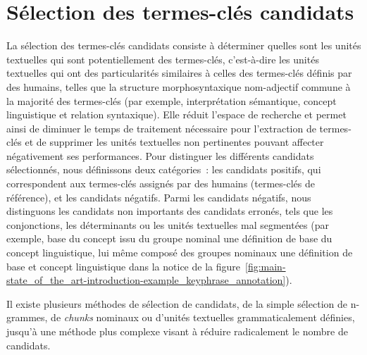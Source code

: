   \section{Sélection des termes-clés candidats}
  \label{sec:main-state_of_the_art-keyphrase_candidate_selection}
    La sélection des termes-clés candidats consiste à déterminer quelles sont
    les unités textuelles qui sont potentiellement des termes-clés, c'est-à-dire
    les unités textuelles qui ont des particularités similaires à celles des
    termes-clés définis par des humains, telles que la structure
    morphosyntaxique nom-adjectif commune à la majorité des termes-clés
    (par exemple, \og{}interprétation sémantique\fg{}, \og{}concept
    linguistique\fg{} et
    \og{}relation syntaxique\fg{}). Elle réduit l'espace de recherche et permet
    ainsi de diminuer le temps de traitement nécessaire pour l'extraction de
    termes-clés et de supprimer les
    unités textuelles non pertinentes pouvant affecter négativement ses
    performances. Pour distinguer les différents candidats sélectionnés, nous
    définissons deux catégories~: les candidats positifs, qui
    correspondent aux termes-clés assignés par des humains (termes-clés de
    référence), et les candidats négatifs. Parmi les candidats négatifs,
    nous distinguons les candidats non importants des candidats erronés, tels que les conjonctions, les
    déterminants ou les unités textuelles mal segmentées (par exemple,
    \og{}base du concept\fg{} issu du groupe nominal \og{}une définition de base
    du concept linguistique\fg{}, lui même composé des groupes nominaux
    \og{}une définition de base\fg{} et \og{}concept linguistique\fg{} dans la
    notice de la
    figure~\ref{fig:main-state_of_the_art-introduction-example_keyphrase_annotation}).

    Il existe plusieurs méthodes de sélection de candidats, de la simple
    sélection de n-grammes, de \textit{chunks} nominaux ou d'unités textuelles
    grammaticalement définies, jusqu'à une méthode plus complexe visant à
    réduire radicalement le nombre de candidats.

